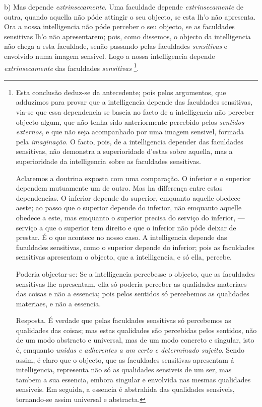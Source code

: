b) Mas depende \emph{extrinsecamente}. Uma faculdade depende \emph{extrinsecamente} de outra, quando aquella não póde attingir o seu objecto, se esta lh'o não apresenta. Ora a nossa intelligencia não póde perceber o seu objecto, se as faculdades sensitivas lh'o não apresentarem; pois, como dissemos, o objecto da intelligencia não chega a esta faculdade, senão passando pelas faculdades \emph{sensitivas} e envolvido numa imagem sensivel. Logo a nossa intelligencia depende \emph{extrinsecamente} das faculdades \emph{sensitivas} \footnote{Esta conclusão deduz-se da antecedente; pois pelos argumentos, que adduzimos para provar que a intelligencia depende das faculdades sensitivas, via-se que essa dependencia se baseia no facto de a intelligencia não perceber objecto algum, que não tenha sido anteriormente percebido pelos \emph{sentidos externos}, e que não seja acompanhado por uma imagem sensivel, formada pela \emph{imaginação}. O facto, pois, de a intelligencia depender das faculdades sensitivas, não demonstra a superioridade d'estas sobre aquella, mas a superioridade da intelligencia sobre as faculdades sensitivas.\par Aclaremos a doutrina exposta com uma comparação. O inferior e o superior dependem mutuamente um de outro. Mas ha differença entre estas dependencias. O inferior depende do superior, emquanto aquelle obedece aeste; ao passo que o superior depende do inferior, não emquanto aquelle obedece a este, mas emquanto o superior precisa do serviço do inferior, --- serviço a que o superior tem direito e que o inferior não póde deixar de prestar. É o que acontece no nosso caso. A intelligencia depende das faculdades sensitivas, como o superior depende do inferior; pois as faculdades sensitivas apresentam o objecto, que a intelligencia, e só ella, percebe.\par Poderia objectar-se: Se a intelligencia percebesse o objecto, que as faculdades sensitivas lhe apresentam, ella só poderia perceber as qualidades materiaes das coisas e não a essencia; pois pelos sentidos só percebemos as qualidades materiaes, e não a essencia.\par Resposta. É verdade que pelas faculdades sensitivas só percebemos as qualidades das coisas; mas estas qualidades são percebidas pelos sentidos, não de um modo abstracto e universal, mas de um modo concreto e singular, isto é, emquanto \emph{unidas e adherentes a um certo e determinado sujeito}. Sendo assim, é claro que o objecto, que as faculdades sensitivas apresentam á intelligencia, representa não só as qualidades sensiveis de um ser, mas tambem a sua essencia, embora singular e envolvida nas mesmas qualidades sensiveis. Em seguida, a essencia é abstrahida das qualidades sensiveis, tornando-se assim universal e abstracta.}.

